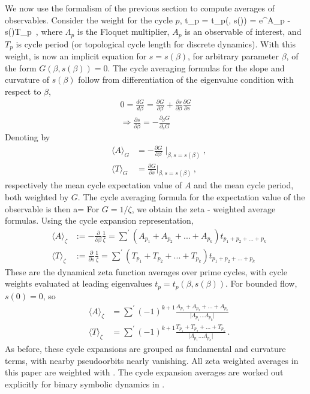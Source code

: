 \documentclass[aps,pre,
                showpacs,
                twocolumn,
                groupedaddress,
                floatfix]{revtex4-1}
\begin{document}
We now use the formalism of the previous section to compute averages of
observables. Consider the weight for the cycle $p$,
\beq
t_{p} = t_{p}(\beta, s(\beta)) =  e^{\beta A_{p} - s(\beta)T_{p}}
\,,
where $\Lambda_{p}$ is the Floquet multiplier, $A_{p}$ is an observable
of interest, and $T_{p}$ is cycle period (or topological cycle length for
discrete dynamics). With this weight,  is now an implicit
equation for $s=s(\beta)$, for arbitrary parameter $\beta$, of the form
$G(\beta, s(\beta)) = 0$. The cycle averaging formulas for the slope and
curvature of $s(\beta)$ follow from differentiation of the eigenvalue
condition with respect to $\beta$,
\begin{eqnarray*}
0 = \frac{d G}{d\beta} = \frac{\partial G}{\partial \beta} + \frac{\partial s}{\partial \beta}\frac{\partial G}{\partial s}
\\ \Rightarrow \frac{\partial s}{\partial \beta} = -\frac{\partial_{\beta}G}{\partial_{s} G}
\end{eqnarray*}
Denoting by
\begin{eqnarray*}
&\langle A\rangle_{G}& = -\frac{\partial G}{\partial \beta}\mid_{\beta, s=s(\beta)},\\ &\langle T \rangle_{G}& = \frac{\partial G}{\partial s}\vert_{\beta, s=s(\beta)}
\,,
\end{eqnarray*}
respectively the mean cycle expectation value of $A$ and the mean cycle
period, both weighted by $G$. The cycle averaging formula for the
expectation value of the observable is then
\beq
\langle a\rangle = 
For $G = 1/\zeta$, we obtain the zeta - weighted average formulas. Using
the cycle expansion representation,
\begin{eqnarray*}
&\langle A \rangle_{\zeta}&:=-\frac{\partial}{\partial \beta}\frac{1}{\zeta}=\sum^{'}(A_{p_{1}}+A_{p_{2}}+...+A_{p_{k}})t_{p_{1}+p_{2}+...+p_{k}} \\
&\langle T \rangle_{\zeta}&:=\frac{\partial}{\partial s}\frac{1}{\zeta}=\sum^{'}(T_{p_{1}}+T_{p_{2}}+...+T_{p_{k}})t_{p_{1}+p_{2}+...+p_{k}}
\end{eqnarray*}
These are the dynamical zeta function averages over prime cycles, with
cycle weights evaluated at leading eigenvalues $t_{p} =
t_{p}(\beta,s(\beta))$. For bounded flow, $s(0)=0$, so
\begin{eqnarray*}
&\langle A \rangle_{\zeta}& = \sum^{'}(-1)^{k+1}\frac{A_{p_{1}}+A_{p_{2}}+...+A_{p_{k}}}{\vert \Lambda_{p_{1}}...\Lambda_{p_{k}}\vert}\\
&\langle T \rangle_{\zeta}& = \sum^{'}(-1)^{k+1}\frac{T_{p_{1}}+T_{p_{2}}+...+T_{p_{k}}}{\vert \Lambda_{p_{1}}...\Lambda_{p_{k}}\vert}
\,.
\end{eqnarray*}
As before, these cycle expansions are grouped as fundamental and
curvature terms, with nearby pseudoorbits nearly vanishing. All zeta
weighted averages in this paper are weighted with . The
cycle expansion averages are worked out explicitly for binary symbolic
dynamics in .
\end{document}

